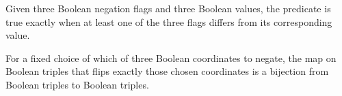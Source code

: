 \begin{definition}
\label{FABL.e3SatPredicate}
\leanok
Given three Boolean negation flags and three Boolean values, the predicate is true
exactly when at least one of the three flags differs from its corresponding value.
\end{definition}

\begin{definition}
\label{FABL.e3SatNegationEquiv}
\leanok
For a fixed choice of which of three Boolean coordinates to negate, the map on Boolean
triples that flips exactly those chosen coordinates is a bijection from Boolean triples
to Boolean triples.
\end{definition}

